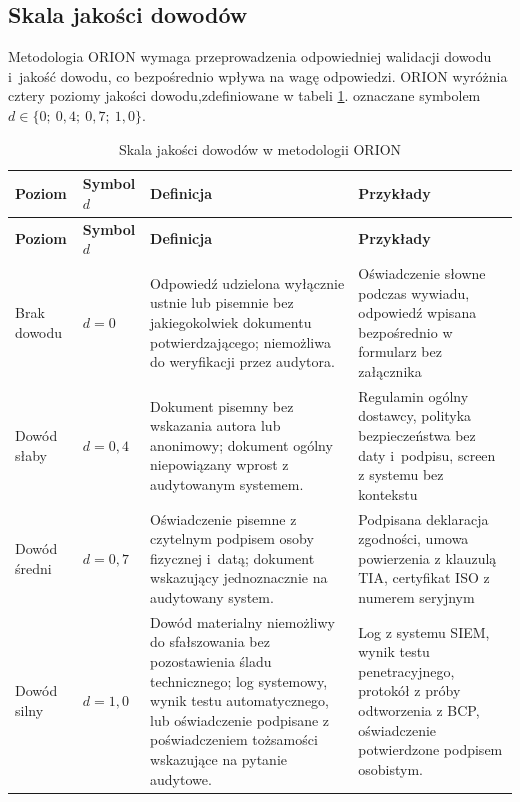 \subsection{Skala jakości dowodów}

Metodologia ORION wymaga przeprowadzenia odpowiedniej walidacji dowodu i~jakość dowodu, co bezpośrednio wpływa na wagę odpowiedzi.
ORION wyróżnia cztery poziomy jakości dowodu,zdefiniowane w tabeli \ref{tab:dowody}.
oznaczane symbolem $d \in \{0;\ 0{,}4;\ 0{,}7;\ 1{,}0\}$.

\nopagebreak %
\renewcommand{\arraystretch}{1.6}
\begin{longtable}{p{1.5cm}p{2.5cm}p{4.5cm}p{4.5cm}}
\caption{Skala jakości dowodów w metodologii ORION} \label{tab:dowody} \\
\toprule
\textbf{Poziom} & \textbf{Symbol $d$} & \textbf{Definicja} & \textbf{Przykłady} \\
\midrule
\endfirsthead
\toprule
\textbf{Poziom} & \textbf{Symbol $d$} & \textbf{Definicja} & \textbf{Przykłady} \\
\midrule
\endhead

Brak dowodu & $d = 0$
& Odpowiedź udzielona wyłącznie ustnie lub pisemnie
  bez jakiegokolwiek dokumentu potwierdzającego;
  niemożliwa do weryfikacji przez audytora.
& Oświadczenie słowne podczas wywiadu,
  odpowiedź wpisana bezpośrednio w formularz
  bez załącznika \\
\midrule
Dowód słaby & $d = 0{,}4$
& Dokument pisemny bez wskazania autora lub
  anonimowy; dokument ogólny niepowiązany
  wprost z audytowanym systemem.
& Regulamin ogólny dostawcy, polityka
  bezpieczeństwa bez daty i~podpisu,
  screen z systemu bez kontekstu \\
\midrule
Dowód średni & $d = 0{,}7$
& Oświadczenie pisemne z czytelnym podpisem
  osoby fizycznej i~datą; dokument wskazujący
  jednoznacznie na audytowany system.
& Podpisana deklaracja zgodności,
  umowa powierzenia z klauzulą TIA,
  certyfikat ISO z numerem seryjnym \\
\midrule
Dowód silny & $d = 1{,}0$
& Dowód materialny niemożliwy do sfałszowania
  bez pozostawienia śladu technicznego;
  log systemowy, wynik testu automatycznego,
  lub oświadczenie podpisane z poświadczeniem
  tożsamości wskazujące na pytanie audytowe.
& Log z systemu SIEM, wynik testu
  penetracyjnego, protokół z próby odtworzenia
  z BCP, oświadczenie potwierdzone podpisem osobistym. \\
\bottomrule

\end{longtable}

